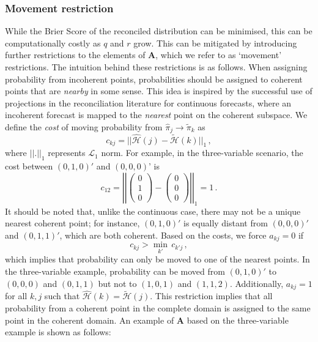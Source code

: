 \documentclass[a4paper,review,11pt,authoryear]{elsarticle}
\theoremstyle{definition}
\begin{document}
    \subsubsection*{\textbf{Movement restriction}}
    While the Brier Score of the reconciled distribution can be minimised, this can be computationally costly as $q$ and $r$ grow. This can be mitigated by introducing further restrictions to the elements of $\mathbf{A}$, which we refer to as `movement' restrictions.  The intuition behind these restrictions is as follows. When assigning probability from incoherent points, probabilities should be assigned to coherent points that are \emph{nearby} in some sense. This idea is inspired by the successful use of projections in the reconciliation literature for continuous forecasts, where an incoherent forecast is mapped to the \emph{nearest} point on the coherent subspace. We define the \emph{cost} of moving probability from $\hat{\pi}_j\rightarrow\tilde{\pi}_k$ as
    \[
    c_{kj}=||\hat{\mathcal{H}}(j)-\tilde{\mathcal{H}}(k)||_1\,,
    \]
    where $||.||_1$ represents $\mathcal{L}_1$ norm. For example, in the three-variable scenario, the cost between $(0, 1, 0)'$ and $(0, 0, 0)$' is
    \[
    c_{12}=\left|\left|\begin{pmatrix}0\\1\\0\end{pmatrix}-\begin{pmatrix}0\\0\\0\end{pmatrix}\right|\right|_1=1\,.
    \]
    It should be noted that, unlike the continuous case, there may not be a unique nearest coherent point; for instance, $(0,1,0)'$ is equally distant from $(0,0,0)'$ and $(0,1,1)'$, which are both coherent.
    Based on the costs, we force $a_{kj}=0$ if
    \[
      c_{kj}>\underset{k'}{\min}\,c_{k'j}\,,
    \]
    which implies that probability can only be moved to one of the nearest points. In the three-variable example, probability can be moved from $(0,1,0)'$ to $(0,0,0)$ and $(0,1,1)$ but not to $(1,0,1)$ and $(1,1,2)$.
    Additionally, $a_{kj}=1$ for all $k,j$ such that $\hat{\mathcal{H}}(k)=\tilde{\mathcal{H}}(j)$.
    This restriction implies that all probability from a coherent point in the complete domain is assigned to the same point in the coherent domain. An example of $\mathbf{A}$ based on the three-variable example is shown as follows:
\end{document}
